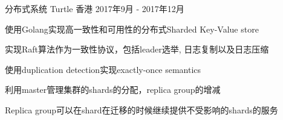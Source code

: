 \cventry
{分布式系统} %
{Turtle} %
{香港} %
{2017年9月 - 2017年12月} %
{ %
\begin{cvitems}
    \item {使用Golang实现高一致性和可用性的分布式Sharded Key-Value store}
    \item {实现Raft算法作为一致性协议，包括leader选举, 日志复制以及日志压缩}
    \item {使用duplication detection实现exactly-once semantics}
    \item {利用master管理集群的shards的分配，replica group的增减}
    \item {Replica group可以在shard在迁移的时候继续提供不受影响的shards的服务}
\end{cvitems}
}